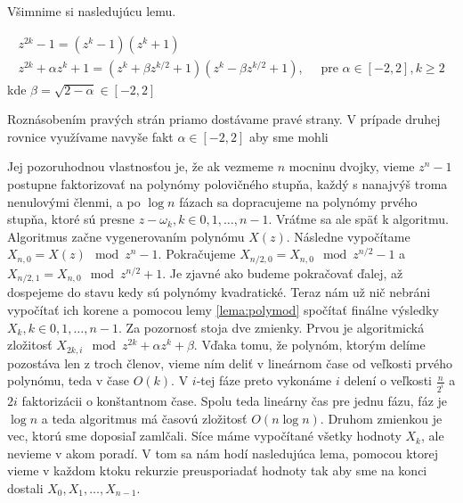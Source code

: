 Všimnime si nasledujúcu lemu.
\begin{lema}
    \begin{align}
        z^{2k} -1 = (z^k - 1)( z^k + 1) \\
        z^{2k} + \alpha z^k + 1 = ( z^k + \beta z^{k/2} + 1)
            ( z^k - \beta z^{k/2} + 1), \quad
            \text{ pre }\alpha \in [-2,2], k\ge 2
    \end{align}
    kde $\beta = \sqrt{2-\alpha} \in [-2,2]$
\end{lema}
\begin{dokaz}
    Roznásobením pravých strán priamo dostávame pravé strany. V
    prípade druhej rovnice využívame navyše fakt $\alpha \in [-2,2]$
    aby sme mohli
\end{dokaz}
Jej pozoruhodnou vlastnosťou je, že ak vezmeme $n$ mocninu dvojky,
vieme $z^n-1$ postupne faktorizovať na polynómy polovičného stupňa,
každý s nanajvýš troma nenulovými členmi, a po $\log n$ fázach sa
dopracujeme na polynómy prvého stupňa, ktoré sú presne $z-\omega_k, 
k\in0,1,\dots,n-1$. 
Vráťme sa ale späť k algoritmu. Algoritmus začne vygenerovaním
polynómu $X(z)$. Následne vypočítame $X_{n,0} =X(z) \mod z^n -1$.
Pokračujeme $X_{n/2,0} = X_{n,0} \mod z^{n/2}-1$ a 
$X_{n/2,1} = X_{n,0} \mod z^{n/2}+1$. Je zjavné ako budeme pokračovať
ďalej, až dospejeme do stavu kedy sú polynómy kvadratické. Teraz nám
už nič nebráni vypočítať ich korene a pomocou lemy \ref{lema:polymod}
spočítať finálne výsledky $X_k, k\in 0,1,\dots,n-1$. Za pozornosť
stoja dve zmienky. Prvou je algoritmická zložitosť
$X_{2k,i} \mod z^{2k} + \alpha z^k + \beta$. Vďaka tomu, že polynóm,
ktorým delíme pozostáva len z troch členov, vieme ním deliť v
lineárnom čase od veľkosti prvého polynómu, teda v čase $O(k)$. V
$i$-tej fáze preto vykonáme $i$ delení o veľkosti $\frac{n}{2^i}$ a
$2i$ faktorizácii o konštantnom čase. Spolu teda lineárny čas pre
jednu fázu, fáz je $\log n$ a teda algoritmus má časovú
zložitosť $O(n \log n)$.
Druhom zmienkou je vec, ktorú sme doposiaľ zamlčali. Síce máme
vypočítané všetky hodnoty $X_k$, ale nevieme v akom poradí.
V tom sa nám hodí nasledujúca lema, pomocou ktorej vieme v každom
ktoku rekurzie preusporiadať hodnoty tak aby sme na konci dostali
$X_0,X_1,\dots,X_{n-1}$.
